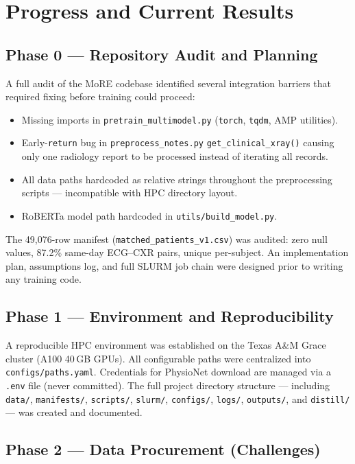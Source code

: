\documentclass[sigconf,nonacm]{acmart}
\begin{document}
\section{Progress and Current Results}

\subsection{Phase 0 — Repository Audit and Planning}

A full audit of the MoRE codebase identified several integration barriers
that required fixing before training could proceed:
\begin{itemize}[noitemsep]
  \item Missing imports in \texttt{pretrain\_multimodel.py} (\texttt{torch},
        \texttt{tqdm}, AMP utilities).
  \item Early-\texttt{return} bug in \texttt{preprocess\_notes.py}
        \texttt{get\_clinical\_xray()} causing only one radiology report
        to be processed instead of iterating all records.
  \item All data paths hardcoded as relative strings throughout the
        preprocessing scripts — incompatible with HPC directory layout.
  \item RoBERTa model path hardcoded in \texttt{utils/build\_model.py}.
\end{itemize}
The 49,076-row manifest (\texttt{matched\_patients\_v1.csv}) was audited:
zero null values, 87.2\% same-day ECG–CXR pairs, unique per-subject.
An implementation plan, assumptions log, and full SLURM job chain were
designed prior to writing any training code.

\subsection{Phase 1 — Environment and Reproducibility}

A reproducible HPC environment was established on the Texas A\&M Grace
cluster (A100 40\,GB GPUs). All configurable paths were centralized into
\texttt{configs/paths.yaml}. Credentials for PhysioNet download are
managed via a \texttt{.env} file (never committed). The full project
directory structure — including \texttt{data/}, \texttt{manifests/},
\texttt{scripts/}, \texttt{slurm/}, \texttt{configs/}, \texttt{logs/},
\texttt{outputs/}, and \texttt{distill/} — was created and documented.

\subsection{Phase 2 — Data Procurement (Challenges)}
\end{document}
